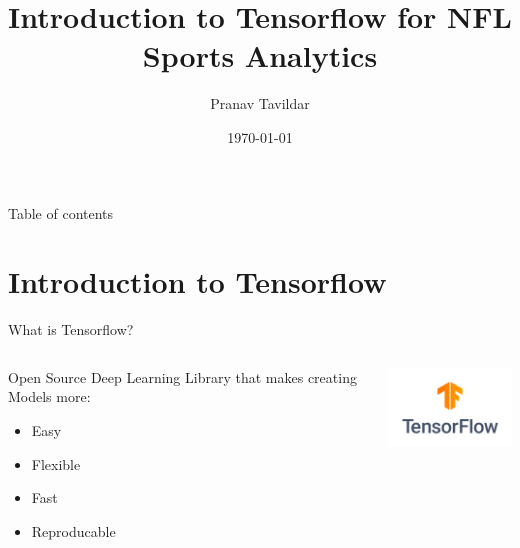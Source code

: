 \documentclass{beamer}
\title[IntroToTensorflow]{Introduction to Tensorflow for NFL Sports Analytics}
\author[Pranav]{Pranav Tavildar}
\institute[UConn]{UConn Sports Analytics Symposium 2022}
\date{\today}
\begin{document}
\lstset{
    frame       = single,
    numbers     = left,
    showspaces  = false,
    showstringspaces    = false,
}

\begin{frame}
\titlepage
\end{frame}


\begin{frame}{Table of contents}
\tableofcontents
\end{frame}

\section{Introduction to Tensorflow}

\begin{frame}[fragile]{What is Tensorflow?}

  \begin{columns}[T]
    \begin{column}{.5\textwidth}
     \begin{block}{Open Source Deep Learning Library that makes creating Models more:}
     \begin{itemize}
     \item Easy
     \item Flexible
     \item Fast
     \item Reproducable
    \end{itemize}
    \end{block}
    \end{column}
    \begin{column}{.5\textwidth}
    \begin{block}{}
    {\includegraphics[width=4cm]{images/tflogo.png}}
    \end{block}
    \end{column}
  \end{columns}

\end{frame}
\end{document}
